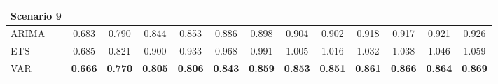 \begin{table}[!htb]
{\begin{tabular}{lcccccccccccc}
\hline
Scenario 9\\
\hline
ARIMA & 0.683 & 0.790 & 0.844 & 0.853 & 0.886 & 0.898 & 0.904 & 0.902 & 0.918 & 0.917 & 0.921 & 0.926\\
ETS & 0.685 & 0.821 & 0.900 & 0.933 & 0.968 & 0.991 & 1.005 & 1.016 & 1.032 & 1.038 & 1.046 & 1.059\\
VAR & \textbf{0.666} & \textbf{0.770} & \textbf{0.805} & \textbf{0.806} & \textbf{0.843} & \textbf{0.859} & \textbf{0.853} & \textbf{0.851} & \textbf{0.861} & \textbf{0.866} & \textbf{0.864} & \textbf{0.869}\\
\hline\end{tabular}}\label{tab:RMSSE}\end{table}
